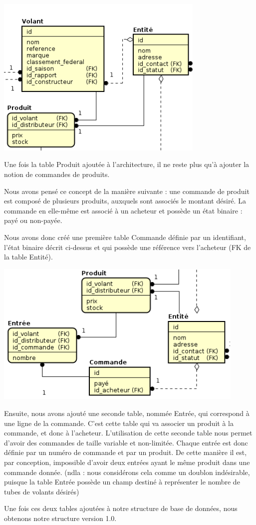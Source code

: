 \documentclass[french,a4paper,12pt]{report}
\begin{document}
\includegraphics[width=10cm]{ensemble2.png}

Une fois la table Produit ajoutée à l'architecture, il ne reste plus qu'à
ajouter la notion de commandes de produits.

Nous avons pensé ce concept de la manière suivante : une commande de produit
est composé de plusieurs produits, auxquels sont associés le montant désiré.
La commande en elle-même est associé à un acheteur et possède un état binaire :
payé ou non-payée.

Nous avons donc créé une première table Commande définie par un identifiant,
l'état binaire décrit ci-dessus et qui possède une référence vers l'acheteur
(FK de la table Entité).

\includegraphics[width=12cm]{ensemble3.png}

Ensuite, nous avons ajouté une seconde table, nommée Entrée, qui correspond à
une ligne de la commande. C'est cette table qui va associer un produit à la
commande, et donc à l'acheteur. L'utilisation de cette seconde table nous permet
 d'avoir des commandes de taille variable et non-limitée.
Chaque entrée est donc définie par un numéro de commande et par un produit.
De cette manière il est, par conception, impossible d'avoir deux entrées ayant
 le même produit dans une commande donnée.
(ndla : nous considérons cela comme un doublon indésirable, puisque la table
Entrée possède un champ destiné à représenter le nombre de tubes de volants désirés)

Une fois ces deux tables ajoutées à notre structure de base de données, nous
obtenons notre structure version 1.0.
\end{document}
